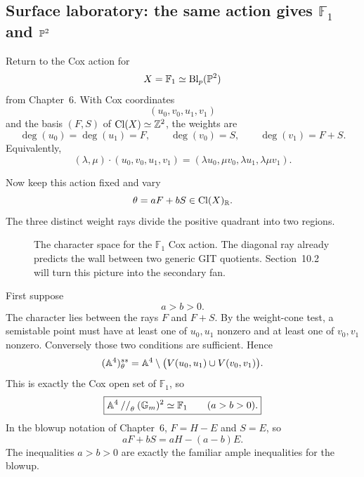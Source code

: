 \subsection{Surface laboratory: the same action gives
\texorpdfstring{\(\mathbb F_1\)}{F1} and
\texorpdfstring{\(\mathbb{P}^2\)}{P2}}

Return to the Cox action for
\[
X=\mathbb F_1\simeq\operatorname{Bl}_p(\mathbb{P}^2)
\]
from Chapter~6.  With Cox coordinates
\[
(u_0,v_0,u_1,v_1)
\]
and the basis \((F,S)\) of \(\operatorname{Cl}(X)\simeq\mathbb{Z}^2\), the weights are
\[
\deg(u_0)=\deg(u_1)=F,
\qquad
\deg(v_0)=S,
\qquad
\deg(v_1)=F+S.
\]
Equivalently,
\[
(\lambda,\mu)\cdot(u_0,v_0,u_1,v_1)
=
(\lambda u_0,\mu v_0,\lambda u_1,\lambda\mu v_1).
\]

Now keep this action fixed and vary
\[
\theta=aF+bS\in\operatorname{Cl}(X)_{\mathbb{R}}.
\]
The three distinct weight rays divide the positive quadrant into two
regions.

\begin{figure}[ht]
\centering
{}
\caption{The character space for the \(\mathbb F_1\) Cox action.  The
diagonal ray already predicts the wall between two generic GIT
quotients.  Section~10.2 will turn this picture into the secondary fan.}
\label{fig:f1-first-vgit-chambers}
\end{figure}

First suppose
\[
a>b>0.
\]
The character lies between the rays \(F\) and \(F+S\).  By the
weight-cone test, a semistable point must have at least one of
\(u_0,u_1\) nonzero and at least one of \(v_0,v_1\) nonzero.  Conversely
those two conditions are sufficient.  Hence
\[
(\mathbb{A}^4)^{ss}_\theta
=
\mathbb{A}^4\setminus
\bigl(V(u_0,u_1)\cup V(v_0,v_1)\bigr).
\]
This is exactly the Cox open set of \(\mathbb F_1\), so
\[
\boxed{
\mathbb{A}^4\mathbin{//}_\theta(\mathbb{G}_{m})^2\simeq\mathbb F_1
\qquad(a>b>0).}
\]
In the blowup notation of Chapter~6, \(F=H-E\) and \(S=E\), so
\[
aF+bS=aH-(a-b)E.
\]
The inequalities \(a>b>0\) are exactly the familiar ample inequalities
for the blowup.

